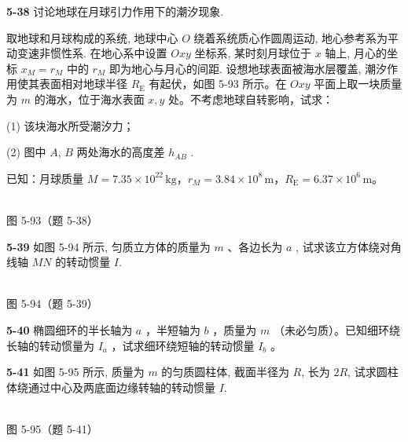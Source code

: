\newpage

\textbf{5-38} 讨论地球在月球引力作用下的潮汐现象.

取地球和月球构成的系统, 地球中心 $O$ 绕着系统质心作圆周运动, 地心参考系为平动变速非惯性系. 在地心系中设置 $Oxy$ 坐标系, 某时刻月球位于 $x$ 轴上, 月心的坐标 $x_{M}=r_{M}$ 中的 $r_{M}$ 即为地心与月心的间距. 设想地球表面被海水层覆盖, 潮汐作用使其表面相对地球半径 $R_{\mathrm{E}}$ 有起伏，如图 5-93 所示。在 $Oxy$ 平面上取一块质量为 $m$ 的海水，位于海水表面 $x, y$ 处。不考虑地球自转影响，试求：

(1) 该块海水所受潮汐力；

(2) 图中 $A$, $B$ 两处海水的高度差 $h_{AB}$ .

已知：月球质量 $M=7.35\times10^{22}\,\mathrm{kg}$，$r_{M}=3.84\times10^{8}\,\mathrm{m}$，$R_{\mathrm E}=6.37\times10^{6}\,\mathrm{m}$。

\begin{center}
\resizebox{0.49\textwidth}{!}{}\\[4pt]
{\small 图 5-93（题 5-38）}
\end{center}

\newpage

\textbf{5-39} 如图 5-94 所示, 匀质立方体的质量为 $m$ 、各边长为 $a$ , 试求该立方体绕对角线轴 $MN$ 的转动惯量 $I$.

\begin{center}
\resizebox{0.39\textwidth}{!}{}\\[4pt]
{\small 图 5-94（题 5-39）}
\end{center}

\newpage

\textbf{5-40} 椭圆细环的半长轴为 $a$ ，半短轴为 $b$ ，质量为 $m$ （未必匀质）。已知细环绕长轴的转动惯量为 $I_{a}$ ，试求细环绕短轴的转动惯量 $I_{b}$ 。

\newpage

\textbf{5-41} 如图 5-95 所示, 质量为 $m$ 的匀质圆柱体, 截面半径为 $R$, 长为 $2R$, 试求圆柱体绕通过中心及两底面边缘转轴的转动惯量 $I$.

\begin{center}
\resizebox{0.40\textwidth}{!}{}\\[4pt]
{\small 图 5-95（题 5-41）}
\end{center}

\newpage

